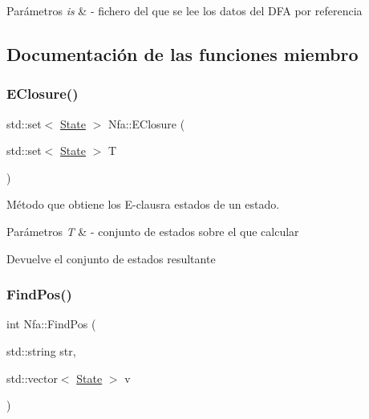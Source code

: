 \begin{DoxyParams}{Parámetros}
{\em is} & -\/ fichero del que se lee los datos del D\+FA por referencia \\
\hline
\end{DoxyParams}


\subsection{Documentación de las funciones miembro}
\mbox{\label{classNfa_aa013967938ea5093bf27a20edc906752}} 
\subsubsection{\texorpdfstring{E\+Closure()}{EClosure()}}
{\footnotesize\ttfamily std\+::set$<$ \hyperlink{classState}{State} $>$ Nfa\+::\+E\+Closure (\begin{DoxyParamCaption}\item[{std\+::set$<$ \hyperlink{classState}{State} $>$}]{T }\end{DoxyParamCaption})}



Método que obtiene los E-\/clausra estados de un estado. 


\begin{DoxyParams}{Parámetros}
{\em T} & -\/ conjunto de estados sobre el que calcular \\
\hline
\end{DoxyParams}
\begin{DoxyReturn}{Devuelve}
el conjunto de estados resultante 
\end{DoxyReturn}
\mbox{\label{classNfa_a23d169f1835db6b72220a941f65641a9}} 
\subsubsection{\texorpdfstring{Find\+Pos()}{FindPos()}}
{\footnotesize\ttfamily int Nfa\+::\+Find\+Pos (\begin{DoxyParamCaption}\item[{std\+::string}]{str,  }\item[{std\+::vector$<$ \hyperlink{classState}{State} $>$}]{v }\end{DoxyParamCaption})}




